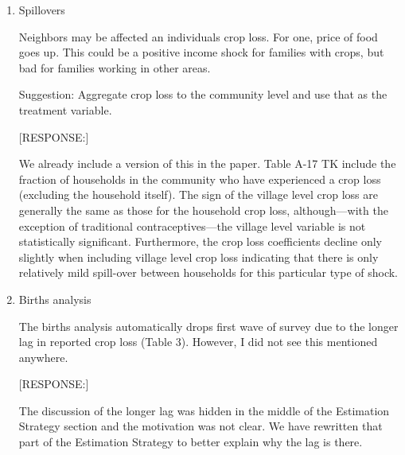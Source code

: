 \documentclass[letterpaper,12pt]{article}
\begin{document}
\begin{enumerate}
\item Spillovers

Neighbors may be affected an individuals crop loss. For one, price of
food goes up. This could be a positive income shock for families with
crops, but bad for families working in other areas.

Suggestion: Aggregate crop loss to the community level and use that as
the treatment variable.


[RESPONSE:]

We already include a version of this in the paper.
Table A-17 TK include the fraction of households in the community 
who have experienced a crop loss (excluding the household itself).
The sign of the village level crop loss are generally the same as
those for the household crop loss, although---with the exception
of traditional contraceptives---the village level variable is not
statistically significant.
Furthermore, the crop loss coefficients decline only slightly
when including village level crop loss indicating that there is
only relatively mild spill-over between households for this
particular type of shock.


\item Births analysis

The births analysis automatically drops first wave of survey due to the
longer lag in reported crop loss (Table 3). However, I did not see this
mentioned anywhere.

[RESPONSE:]

The discussion of the longer lag was hidden in the middle of the 
Estimation Strategy section and the motivation was not clear.
We have rewritten that part of the Estimation Strategy to better
explain why the lag is there.

\end{enumerate}


\newpage


\end{document}
